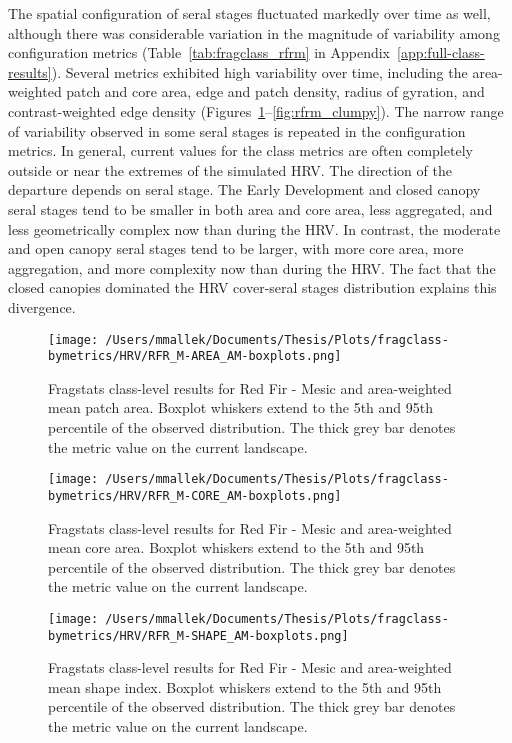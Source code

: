 The spatial configuration of seral stages fluctuated markedly over time as well, although there was considerable variation in the magnitude of variability among configuration metrics (Table~\ref{tab:fragclass_rfrm} in Appendix~\ref{app:full-class-results}). Several metrics exhibited high variability over time, including the area-weighted patch and core area, edge and patch density, radius of gyration, and contrast-weighted edge density (Figures~\ref{fig:rfrm_areaam}--\ref{fig:rfrm_clumpy}). The narrow range of variability observed in some seral stages is repeated in the configuration metrics. In general, current values for the class metrics are often completely outside or near the extremes of the simulated HRV. The direction of the departure depends on seral stage. The Early Development and closed canopy seral stages tend to be smaller in both area and core area, less aggregated, and less geometrically complex now than during the HRV. In contrast, the moderate and open canopy seral stages tend to be larger, with more core area, more aggregation, and more complexity now than during the HRV. The fact that the closed canopies dominated the HRV cover-seral stages distribution explains this divergence.

\begin{figure}[!htbp]
\centering
    \texttt{[image: /Users/mmallek/Documents/Thesis/Plots/fragclass-bymetrics/HRV/RFR\_M-AREA\_AM-boxplots.png]}
  \caption{Fragstats class-level results for Red Fir - Mesic and area-weighted mean patch area. Boxplot whiskers extend to the 5th and 95th percentile of the observed distribution. The thick grey bar denotes the metric value on the current landscape.}
  \label{fig:rfrm_areaam}
\end{figure}


\begin{figure}[!htbp]
\centering
    \texttt{[image: /Users/mmallek/Documents/Thesis/Plots/fragclass-bymetrics/HRV/RFR\_M-CORE\_AM-boxplots.png]}
  \caption{Fragstats class-level results for Red Fir - Mesic and area-weighted mean core area. Boxplot whiskers extend to the 5th and 95th percentile of the observed distribution. The thick grey bar denotes the metric value on the current landscape.}
  \label{fig:rfrm_coream}
\end{figure}


\begin{figure}[!htbp]
\centering
    \texttt{[image: /Users/mmallek/Documents/Thesis/Plots/fragclass-bymetrics/HRV/RFR\_M-SHAPE\_AM-boxplots.png]}
  \caption{Fragstats class-level results for Red Fir - Mesic and area-weighted mean shape index. Boxplot whiskers extend to the 5th and 95th percentile of the observed distribution. The thick grey bar denotes the metric value on the current landscape.}
  \label{fig:rfrm_shapeam}
\end{figure}


